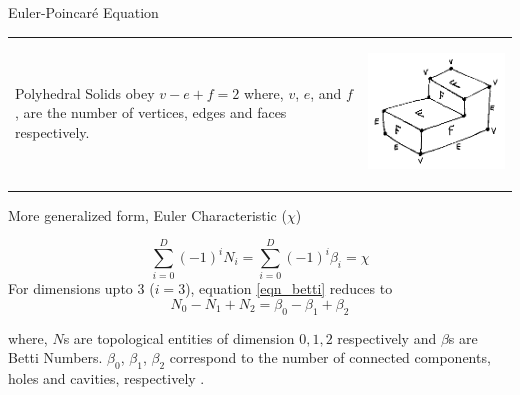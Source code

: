 \begin{frame}{Euler-Poincar\'e Equation}
\begin{tabular}[h]{@{}p{0.7\linewidth} p{0.3\linewidth}@{}} 
Polyhedral Solids obey $v - e + f = 2$ \newline where, $v$, $e$, and $f$, are the number of vertices, edges and faces respectively.  
&
\begin{center}
\includegraphics[width=0.65\linewidth]{../Common/images/Euler}
\end{center}
\\
\end{tabular}
More generalized form, Euler Characteristic ($\chi$)

\begin{equation}
\sum_{i=0 }^D(-1)^{i} N_{i}= \sum_{i=0}^D(-1)^{i} \beta_{i} = \chi 
\label{eqn_betti}
\end{equation}
For dimensions upto 3 ($i=3$), equation \ref{eqn_betti} reduces to
\begin{equation}
N_{0}-N_{1}+N_{2}= \beta_{0} -\beta_{1} + \beta_{2}
\label{eqn_betti3}
\end{equation}

where, $N$s are topological entities of dimension $0,1,2$ respectively and $\beta$s are Betti Numbers. $\beta_{0}$, $\beta_{1}$, $\beta_{2}$ correspond to  the number of connected components, holes and cavities, respectively \cite{Sequin}. 
\end{frame}


